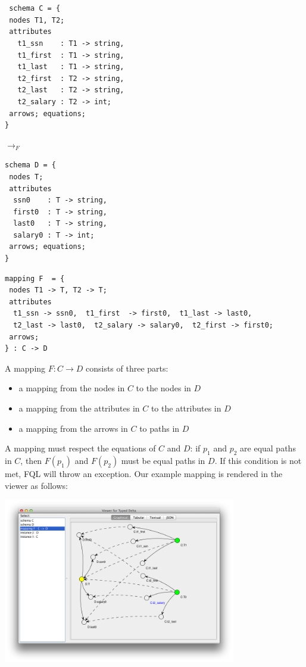 \documentclass[12pt]{article}
\begin{document}
 \begin{minipage}{0.4\textwidth}
\begin{verbatim} 


 schema C = {
 nodes T1, T2;
 attributes
   t1_ssn    : T1 -> string, 
   t1_first  : T1 -> string, 
   t1_last   : T1 -> string,
   t2_first  : T2 -> string, 
   t2_last   : T2 -> string, 
   t2_salary : T2 -> int;
 arrows; equations; 
}
    \end{verbatim}
  \end{minipage}
   \hspace{.5in} $\to_F$ \hspace{.5in}
  \begin{minipage}{0.4\textwidth}
\begin{verbatim} 
schema D = {
 nodes T;
 attributes
  ssn0    : T -> string, 
  first0  : T -> string,
  last0   : T -> string,
  salary0 : T -> int;
 arrows; equations;
}    
\end{verbatim} \end{minipage}
  
\begin{verbatim}
mapping F  = {
 nodes T1 -> T, T2 -> T;
 attributes
  t1_ssn -> ssn0,  t1_first  -> first0,  t1_last -> last0,
  t2_last -> last0,  t2_salary -> salary0,  t2_first -> first0;
 arrows;
} : C -> D
\end{verbatim}
A mapping $F : C \to D$ consists of three parts:
\begin{itemize}
\item a mapping from the nodes in $C$ to the nodes in $D$
\item a mapping from the attributes in $C$ to the attributes in $D$
\item a mapping from the arrows in $C$ to paths in $D$
\end{itemize}
A mapping must respect the equations of $C$ and $D$: if $p_1$ and $p_2$ are equal paths in $C$, then $F(p_1)$ and $F(p_2)$ must be equal paths in $D$.  If this condition is not met, FQL will throw an exception.  Our example mapping is rendered in the viewer as follows:

\begin{center}
\includegraphics[width=4in]{mapping}
\end{center}
\end{document}
